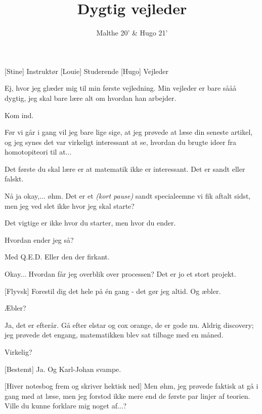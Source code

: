 \documentclass[a4paper,11pt]{article}
\title{Dygtig vejleder}
\author{Malthe 20' \& Hugo 21'}
\begin{document}
\maketitle

\begin{roles}
[Stine] Instruktør
[Louie] Studerende
[Hugo] Vejleder
\end{roles}


\begin{sketch}

 Ej, hvor jeg glæder mig til min første vejledning. Min vejleder er bare sååå dygtig, jeg skal bare lære alt om hvordan han arbejder.


 Kom ind. 


 Før vi går i gang vil jeg bare lige sige, at jeg prøvede at læse din seneste artikel, og jeg synes det var virkeligt interessant at se, hvordan du brugte ideer fra homotopiteori til at...


 Det første du skal lære er at matematik ikke er interessant. Det er sandt eller falskt.

 Nå ja okay,... øhm. Det er et \emph{(kort pause)} sandt specialeemne vi fik aftalt sidst, men jeg ved slet ikke hvor jeg skal starte?

 Det vigtige er ikke hvor du starter, men hvor du ender.

 Hvordan ender jeg så? 

 Med Q.E.D. Eller den der firkant.

 Okay... Hvordan får jeg overblik over processen? Det er jo et stort projekt. 

[Flyvsk] Forestil dig det hele på én gang - det gør jeg altid. Og æbler.

 Æbler?

 Ja, det er efterår. Gå efter elstar og cox orange, de er gode nu. Aldrig discovery; jeg prøvede det engang, matematikken blev sat tilbage med en måned.

 Virkelig?

[Bestemt] Ja. Og Karl-Johan svampe.

[Hiver notesbog frem og skriver hektisk ned] Men øhm, jeg prøvede faktisk at gå i gang med at læse, men jeg forstod ikke mere end de første par linjer af teorien. Ville du kunne forklare mig noget af...?


\end{sketch}
\end{document}
